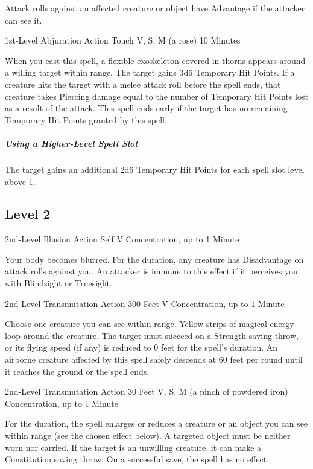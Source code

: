 \documentclass[letterpaper,openany,oneside,twocolumn]{book}
\begin{document}
Attack rolls against an affected creature or object have Advantage if the attacker can see it.

	{1st-Level Abjuration}
	{Action}
	{Touch}
	{V, S, M (a rose)}
	{10 Minutes}

When you cast this spell, a flexible exoskeleton covered in thorns appears around a willing target within range. The target gains 3d6 Temporary Hit Points. If a creature hits the target with a melee attack roll before the spell ends, that creature takes Piercing damage equal to the number of Temporary Hit Points lost as a result of the attack. This spell ends early if the target has no remaining Temporary Hit Points granted by this spell.

\subparagraph*{Using a Higher-Level Spell Slot} The target gains an additional 2d6 Temporary Hit Points for each spell slot level above 1.

\subsection*{Level 2}

	{2nd-Level Illusion}
	{Action}
	{Self}
	{V}
	{Concentration, up to 1 Minute}

Your body becomes blurred. For the duration, any creature has Disadvantage on attack rolls against you. An attacker is immune to this effect if it perceives you with Blindsight or Truesight.

	{2nd-Level Transmutation}
	{Action}
	{300 Feet}
	{V}
	{Concentration, up to 1 Minute}

Choose one creature you can see within range. Yellow strips of magical energy loop around the creature. The target must succeed on a Strength saving throw, or its flying speed (if any) is reduced to 0 feet for the spell's duration. An airborne creature affected by this spell safely descends at 60 feet per round until it reaches the ground or the spell ends.

	{2nd-Level Transmutation}
	{Action}
	{30 Feet}
	{V, S, M (a pinch of powdered iron)}
	{Concentration, up to 1 Minute}

For the duration, the spell enlarges or reduces a creature or an object you can see within range (see the chosen effect below). A targeted object must be neither worn nor carried. If the target is an unwilling creature, it can make a Constitution saving throw. On a successful save, the spell has no effect.
\end{document}
